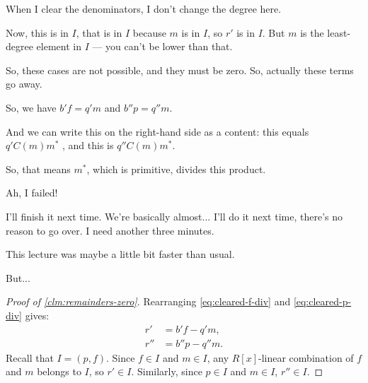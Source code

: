 \begin{proofWrapper}
\begin{speech}[00:41:26 - 00:42:45]
When I clear the denominators, I don't change the degree here.

Now, this is in $I$, that is in $I$ because $m$ is in $I$, so $r'$ is in $I$. But $m$ is the least-degree element in $I$ --- you can't be lower than that.

So, these cases are not possible, and they must be zero. So, actually these terms go away. 

So, we have $b' f = q' m$  and $b'' p = q'' m$. 

And we can write this on the right-hand side as a content: this equals $q' C(m) m^*$ , and this is $q'' C(m) m^*$. 

So, that means $m^*$, which is primitive, divides this product.

Ah, I failed! 

I'll finish it next time. We're basically almost... I'll do it next time, there's no reason to go over. I need another three minutes.

This lecture was maybe a little bit faster than usual.

But... 
\end{speech}

\begin{content}

\begin{proof}[Proof of \cref{clm:remainders-zero}]
Rearranging \eqref{eq:cleared-f-div} and \eqref{eq:cleared-p-div} gives:
\begin{align*}
r' &= b' f - q' m, \\
r'' &= b'' p - q'' m.
\end{align*}
Recall that $I = (p, f)$. Since $f \in I$ and $m \in I$, any $R[x]$-linear combination of $f$ and $m$ belongs to $I$, so $r' \in I$.
Similarly, since $p \in I$ and $m \in I$, $r'' \in I$.


\end{proof}
\end{content}
\end{proofWrapper}
